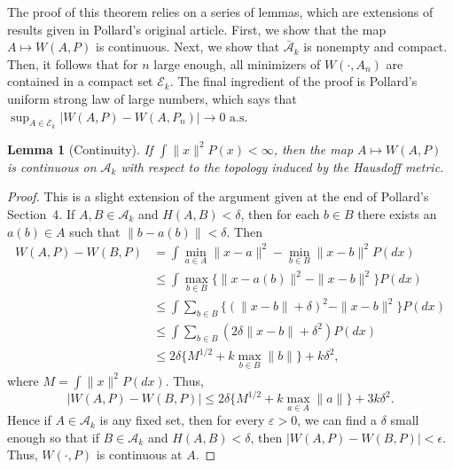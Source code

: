 \documentclass[11pt]{article}
\newtheorem{lemma}{Lemma}
\newcommand{\sA}{\mathcal{A}}
\newcommand{\sbA}{\mathcal{\bar A}}
\newcommand{\sE}{\mathcal{E}}
\begin{document}
The proof of this theorem relies on a series of lemmas, which are extensions
of results given in Pollard's original article.  First, we show that the map
$A \mapsto W(A, P)$ is continuous.  Next, we show that $\sbA_k$ is nonempty
and compact.  Then, it follows that for $n$ large enough, all minimizers of
$W(\cdot, A_n)$ are contained in a compact set $\sE_k$.  The final ingredient
of the proof is Pollard's uniform strong law of large numbers, which says that
$\sup_{A \in \sE_k} |W(A,P) - W(A,P_n)| \to 0\text{ a.s.}$


\begin{lemma}[Continuity]\label{lem:kmeans-continuous}
If $\int \|x\|^2 P(x) < \infty$, then the map $A \mapsto W(A, P)$ is
continuous on $\sA_k$ with respect to the topology induced by the Hausdoff
metric.
\end{lemma}
\begin{proof}
This is a slight extension of the argument given at the end of Pollard's
Section~4.  If $A, B \in \sA_k$ and $H(A, B) < \delta$, then for each $b \in
B$ there exists an $a(b) \in A$ such that $\|b - a(b)\| < \delta$.  Then
\begin{align*}
  W(A, P) - W(B, P)
    &= \int \min_{a \in A} \|x - a\|^2 - \min_{b \in B} \|x - b\|^2 P(dx) \\
    &\leq \int \max_{b \in B} \{ \|x - a(b)\|^2 - \|x - b\|^2 \} P(dx) \\
    &\leq \int \sum_{b \in B} \{ (\|x - b\| + \delta)^2 - \|x - b\|^2 \} P(dx) \\
    &\leq \int \sum_{b \in B}  ( 2 \delta \|x - b\| + \delta^2) P(dx) \\
    &\leq 2 \delta \{M^{1/2} + k \max_{b \in B} \|b\|\} + k \delta^2,
\end{align*}
where $M = \int \|x\|^2 P(dx)$.  Thus,
\[
  |W(A, P) - W(B, P)|
    \leq 2 \delta \{M^{1/2} + k \max_{a \in A} \|a\|\} + 3 k \delta^2.
\]
Hence if $A \in \sA_k$ is any fixed set, then for every $\varepsilon > 0$, we
can find a $\delta$ small enough so that if $B \in \sA_k$ and $H(A, B) <
\delta$, then $|W(A,P) - W(B,P)| < \epsilon$.  Thus, $W(\cdot, P)$ is
continuous at $A$.
\end{proof}
\end{document}
